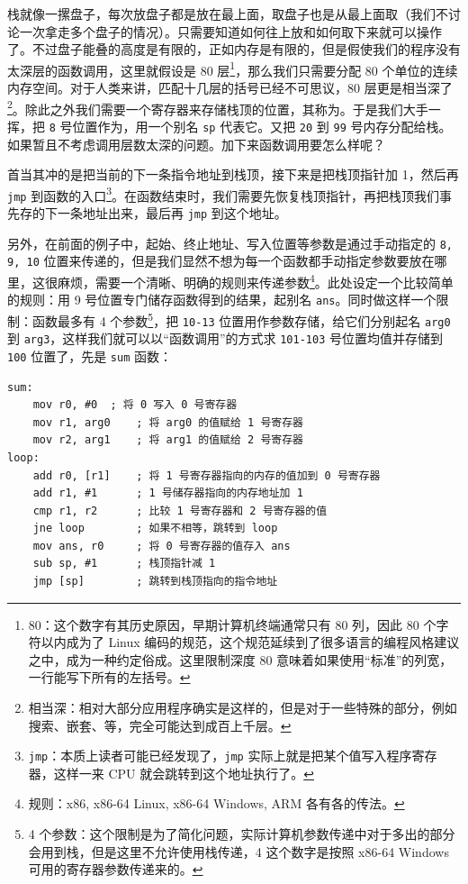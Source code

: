 栈就像一摞盘子，每次放盘子都是放在最上面，取盘子也是从最上面取（我们不讨论一次拿走多个盘子的情况）。只需要知道如何往上放和如何取下来就可以操作了。不过盘子能叠的高度是有限的，正如内存是有限的，但是假使我们的程序没有太深层的函数调用，这里就假设是 80 层\footnote{80：这个数字有其历史原因，早期计算机终端通常只有 80 列，因此 80 个字符以内成为了 Linux 编码的规范，这个规范延续到了很多语言的编程风格建议之中，成为一种约定俗成。这里限制深度 80 意味着如果使用“标准”的列宽，一行能写下所有的左括号。}，那么我们只需要分配 80 个单位的连续内存空间。对于人类来讲，匹配十几层的括号已经不可思议，80 层更是相当深了\footnote{相当深：相对大部分应用程序确实是这样的，但是对于一些特殊的部分，例如搜索、嵌套、等，完全可能达到成百上千层。}。除此之外我们需要一个寄存器来存储栈顶的位置，其称为。于是我们大手一挥，把 \texttt{8} 号位置作为，用一个别名 \texttt{sp} 代表它。又把 \texttt{20} 到 \texttt{99} 号内存分配给栈。如果暂且不考虑调用层数太深的问题。加下来函数调用要怎么样呢？

首当其冲的是把当前的下一条指令地址到栈顶，接下来是把栈顶指针加 1，然后再 \texttt{jmp} 到函数的入口\footnote{\texttt{jmp}：本质上读者可能已经发现了，\texttt{jmp} 实际上就是把某个值写入程序寄存器，这样一来 CPU 就会跳转到这个地址执行了。}。在函数结束时，我们需要先恢复栈顶指针，再把栈顶我们事先存的下一条地址出来，最后再 \texttt{jmp} 到这个地址。

另外，在前面的例子中，起始、终止地址、写入位置等参数是通过手动指定的 \texttt{8, 9, 10} 位置来传递的，但是我们显然不想为每一个函数都手动指定参数要放在哪里，这很麻烦，需要一个清晰、明确的规则来传递参数\footnote{规则：x86, x86-64 Linux, x86-64 Windows, ARM 各有各的传法。}。此处设定一个比较简单的规则：用 9 号位置专门储存函数得到的结果，起别名 \texttt{ans}。同时做这样一个限制：函数最多有 4 个参数\footnote{4 个参数：这个限制是为了简化问题，实际计算机参数传递中对于多出的部分会用到栈，但是这里不允许使用栈传递，4 这个数字是按照 x86-64 Windows 可用的寄存器参数传递来的。}，把 \texttt{10-13} 位置用作参数存储，给它们分别起名 \texttt{arg0} 到 \texttt{arg3}，这样我们就可以以“函数调用”的方式求 \texttt{101-103} 号位置均值并存储到 \texttt{100} 位置了，先是 \texttt{sum} 函数：
\begin{verbatim}
sum:
    mov r0, #0  ; 将 0 写入 0 号寄存器
    mov r1, arg0    ; 将 arg0 的值赋给 1 号寄存器
    mov r2, arg1    ; 将 arg1 的值赋给 2 号寄存器
loop:
    add r0, [r1]    ; 将 1 号寄存器指向的内存的值加到 0 号寄存器
    add r1, #1      ; 1 号储存器指向的内存地址加 1
    cmp r1, r2      ; 比较 1 号寄存器和 2 号寄存器的值
    jne loop        ; 如果不相等，跳转到 loop
    mov ans, r0     ; 将 0 号寄存器的值存入 ans
    sub sp, #1      ; 栈顶指针减 1
    jmp [sp]        ; 跳转到栈顶指向的指令地址
\end{verbatim}


